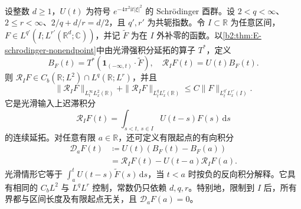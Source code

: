 \begin{proposition}[同对非齐次估计]\label{b2:prop:E-retarded}
设整数 \(d\geq1\)，\(U(t)\) 为符号 \(e^{-4\pi^2\mathrm it|\xi|^2}\) 的 Schrödinger 酉群。设 \(2<q<\infty\)、\(2\leq r<\infty\)、\(2/q+d/r=d/2\)，且 \(q',r'\) 为共轭指数。令 \(I\subset\mathbb R\) 为任意区间，\(F\in L^{q'}(I;L^{r'}(\mathbb R^d;\mathbb C))\)，并记 \(\widetilde F\) 为在 \(I\) 外补零的函数。以\cref{b2:thm:E-schrodinger-nonendpoint}中由光滑强积分延拓的算子 \(T^*\)，定义
\[
 B_F(t)=T^*\left(\mathbf1_{(-\infty,t)}\cdot\widetilde F\right),
 \quad \mathcal R_I F(t)=U(t)B_F(t).
\]
则 \(\mathcal R_I F\in C_b(\mathbb R;L^2)\cap L^q(\mathbb R;L^r)\)，并且
\begin{equation}\label{b2:eq:E-retarded-bound}
 \|\mathcal R_I F\|_{L^\infty_tL^2_x(\mathbb R)}
 +\|\mathcal R_I F\|_{L^q_tL^r_x(\mathbb R)}
 \leq C\|F\|_{L^{q'}_tL^{r'}_x(I)}.
\end{equation}
它是光滑输入上迟滞积分
\[
 \mathcal R_I F(t)=\int_{s<t,\ s\in I}
                         U(t-s)F(s)\,\mathrm ds
\]
的连续延拓。对任意有限 \(a\in\mathbb R\)，还可定义有限起点的有向积分
\begin{equation}\label{b2:eq:E-finite-start-duhamel}
 \begin{aligned}
 \mathcal D_aF(t)
 &\coloneqq U(t)(B_F(t)-B_F(a))\\
 &=\mathcal R_I F(t)-U(t-a)\mathcal R_I F(a).
 \end{aligned}
\end{equation}
光滑情形它等于 \(\int_a^tU(t-s)\widetilde F(s)\,\mathrm ds\)，当 \(t<a\) 时按负的反向积分解释。它具有相同的 \(C_bL^2\) 与 \(L^qL^r\) 控制，常数仍只依赖 \(d,q,r\)。特别地，限制到 \(I\) 后，所有界都与区间长度及有限起点无关，且 \(\mathcal D_aF(a)=0\)。
\end{proposition}
